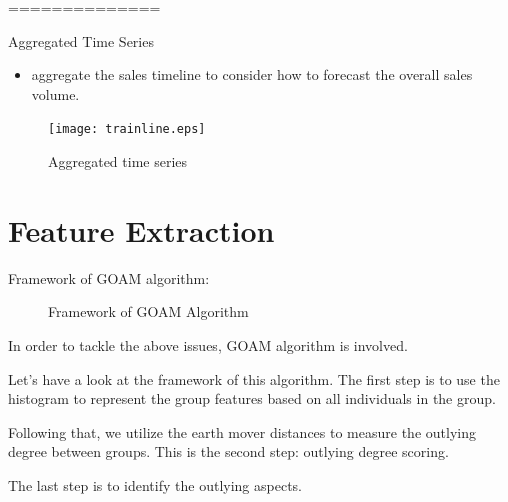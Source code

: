 \documentclass[
 size=14pt,
 paper=smartboard,  %
 mode=present, 		%
 display=slides, 	%
 style=tuliplab,  	%
 pauseslide,
 fleqn,leqno]{powerdot}
\begin{document}
==============
\begin{slide}[toc=,bm=]{Aggregated Time Series}
	\begin{itemize}
		\item
		aggregate the sales timeline to consider how to forecast the overall sales volume.
	\end{itemize}
	\begin{figure}
		\centering
		\texttt{[image: trainline.eps]}
		\caption{Aggregated time series}\label{fig:OutAspect-target}
	\end{figure}
\end{slide}
\section{Feature Extraction}


\begin{slide}[toc=,bm=]{}

Framework of GOAM algorithm:

\bigskip

\begin{figure}
  \centering
  \caption{Framework of GOAM Algorithm} \label{framework}
\end{figure}

\begin{note}
In order to tackle the above issues,
GOAM algorithm is involved.

Let's have a look at the framework of this algorithm.
The first step is to use the histogram to represent the group features
based on all individuals in the group.

Following that,
we utilize the earth mover distances to measure the
outlying degree between groups.
This is the second step:
outlying degree scoring.

The last step is to identify the outlying aspects.

\end{note}

\end{slide}
\end{document}
